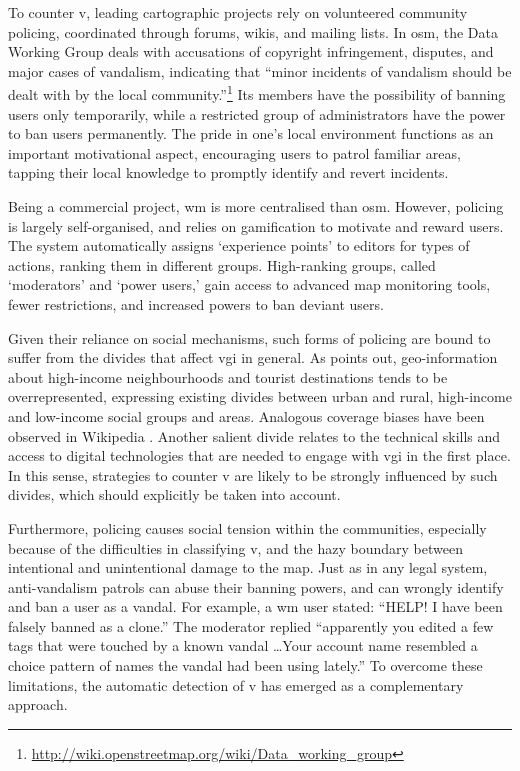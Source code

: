 \documentclass{article} \usepackage{graphicx,xspace}
\newcommand{\footurl}[1]{\footnote{\url{#1}}}
\begin{document}
To counter \gls{v}, leading cartographic projects rely on volunteered community policing, coordinated through forums, wikis, and mailing lists.
In \gls{osm}, the Data Working Group deals with accusations of copyright infringement, disputes, and major cases of vandalism, indicating that ``minor incidents of vandalism should be dealt with by the local community.''\footurl{http://wiki.openstreetmap.org/wiki/Data_working_group}
Its members have the possibility of banning users only temporarily, while a restricted group of administrators have the power to ban users permanently.
The pride in one's local environment functions as an important motivational aspect, encouraging users to patrol familiar areas, tapping their local knowledge to promptly identify and revert incidents.

Being a commercial project, \gls{wm} is more centralised than \gls{osm}.
However, policing is large\-ly self-organised, and relies on gamification to motivate and reward users.
The system automatically assigns `experience points' to editors for types of actions, ranking them in different groups.
High-ranking groups, called `moderators' and `power users,' gain access to advanced map monitoring tools, fewer restrictions, and increased powers to ban deviant users.

Given their reliance on social mechanisms, such forms of policing are bound to suffer from the divides that affect \gls{vgi} in general.
As \cite{elwood:2010:gissocietal} points out, geo-information about high-in\-co\-me neighbourhoods and tourist destinations tends to be overrepresented, expressing existing divides between urban and rural, high-income and low-income social groups and areas.
Analogous coverage biases have been observed in Wikipedia \citep{george:2007:tragedywikicommons}.
Another salient divide relates to the technical skills and access to digital technologies that are needed to engage with \gls{vgi} in the first place.
In this sense, strategies to counter \gls{v} are likely to be strongly influenced by such divides, which should explicitly be taken into account.

Furthermore, policing causes social tension within the communities, especially because of the difficulties in classifying \gls{v}, and the hazy boundary between intentional and unintentional damage to the map.
Just as in any legal system, anti-vandalism patrols can abuse their banning powers, and can wrongly identify and ban a user as a vandal.
For example, a \gls{wm} user stated: ``HELP! I have been falsely banned as a clone.''
The moderator replied ``apparently you edited a few tags that were touched by a known vandal \ldots Your account name resembled a choice pattern of names the vandal had been using lately.''
To overcome these limitations, the automatic detection of \gls{v} has emerged as a complementary approach.
\end{document}
